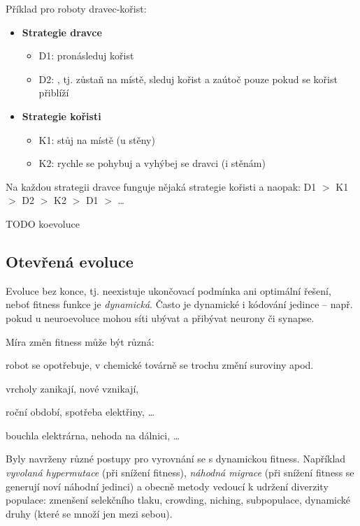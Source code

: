 Příklad pro roboty dravec-kořist:
\begin{itemize}
\item\textbf{Strategie dravce}
	\begin{itemize}
	\item D1: pronásleduj kořist
	\item D2: , tj. zůstaň na místě, sleduj kořist a zaútoč pouze pokud se kořist přiblíží
	\end{itemize}
\item\textbf{Strategie kořisti}
	\begin{itemize}
	\item K1: stůj na místě (u stěny)
	\item K2: rychle se pohybuj a vyhýbej se dravci (i stěnám)
	\end{itemize}
\end{itemize}
Na každou strategii dravce funguje nějaká strategie kořisti a naopak: D1 $>$ K1 $>$ D2 $>$ K2 $>$ D1 $>$ \dots



TODO koevoluce


\subsection{Otevřená evoluce}
Evoluce bez konce, tj. neexistuje ukončovací podmínka ani optimální řešení, neboť fitness funkce je \textit{dynamická}. Často je dynamické i kódování jedince -- např. pokud u neuroevoluce mohou síti ubývat a přibývat neurony či synapse. 

Míra změn fitness může být různá: 
\begin{description}
	\leftskip 30pt
	
	\item[malé změny] robot se opotřebuje, v chemické továrně se trochu změní suroviny apod.
	\item[výrazné morfologické změny] vrcholy zanikají, nové vznikají, 
	\item[cyklické změny] roční období, spotřeba elektřiny, \dots
	\item[katastrofické změny] bouchla elektrárna, nehoda na dálnici, \dots
\end{description}

Byly navrženy různé postupy pro vyrovnání se s dynamickou fitness. Například \textit{vyvolaná hypermutace} (při snížení fitness), \textit{náhodná migrace} (při snížení fitness se generují noví náhodní jedinci) a obecně metody vedoucí k udržení diverzity populace: zmenšení selekčního tlaku, crowding, niching, subpopulace, dynamické druhy (které se množí jen mezi sebou).

